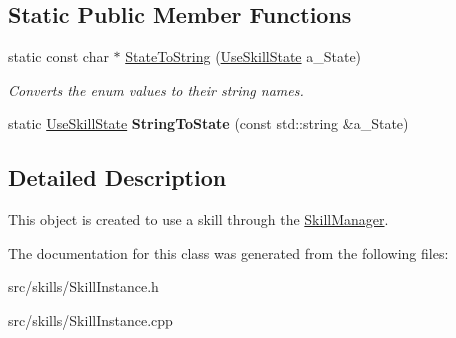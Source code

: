 \subsection*{Static Public Member Functions}
\begin{DoxyCompactItemize}
\item 
\mbox{\label{class_skill_instance_a18435ec49c4114f2de4dba02fe7dd743}} 
static const char $\ast$ \hyperlink{class_skill_instance_a18435ec49c4114f2de4dba02fe7dd743}{State\+To\+String} (\hyperlink{class_skill_instance_a19403519edc60dad57c324d9e976a811}{Use\+Skill\+State} a\+\_\+\+State)
\begin{DoxyCompactList}\small\item\em Converts the enum values to their string names. \end{DoxyCompactList}\item 
\mbox{\label{class_skill_instance_ae4725fa82e4efaf62e14cb0701f41e98}} 
static \hyperlink{class_skill_instance_a19403519edc60dad57c324d9e976a811}{Use\+Skill\+State} {\bfseries String\+To\+State} (const std\+::string \&a\+\_\+\+State)
\end{DoxyCompactItemize}


\subsection{Detailed Description}
This object is created to use a skill through the \hyperlink{class_skill_manager}{Skill\+Manager}. 

The documentation for this class was generated from the following files\+:\begin{DoxyCompactItemize}
\item 
src/skills/Skill\+Instance.\+h\item 
src/skills/Skill\+Instance.\+cpp\end{DoxyCompactItemize}
